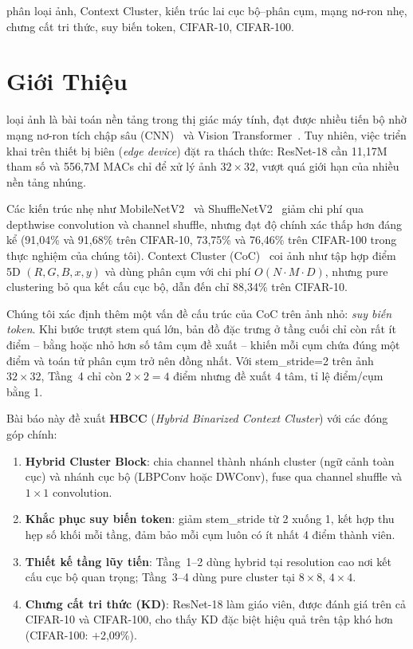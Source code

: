 \documentclass[journal]{IEEEtran}
\begin{document}
\begin{IEEEkeywords}
phân loại ảnh, Context Cluster, kiến trúc lai cục bộ--phân cụm,
mạng nơ-ron nhẹ, chưng cất tri thức, suy biến token, CIFAR-10,
CIFAR-100.
\end{IEEEkeywords}

\section{Giới Thiệu}
\label{sec:intro}

 loại ảnh là bài toán nền tảng trong thị giác máy
tính, đạt được nhiều tiến bộ nhờ mạng nơ-ron tích chập sâu
(CNN)~\cite{He2016ResNet} và Vision Transformer~\cite{Dosovitskiy2021ViT}.
Tuy nhiên, việc triển khai trên thiết bị biên (\textit{edge device})
đặt ra thách thức: ResNet-18 cần 11,17M tham số và 556,7M MACs chỉ để
xử lý ảnh $32\!\times\!32$, vượt quá giới hạn của nhiều nền tảng nhúng.

Các kiến trúc nhẹ như MobileNetV2~\cite{Sandler2018MobileNetV2} và
ShuffleNetV2~\cite{Ma2018ShuffleNetV2} giảm chi phí qua depthwise
convolution và channel shuffle, nhưng đạt độ chính xác thấp hơn đáng
kể (91,04\% và 91,68\% trên CIFAR-10, 73,75\% và 76,46\% trên
CIFAR-100 trong thực nghiệm của chúng tôi). Context Cluster
(CoC)~\cite{Ma2023ImageAsSetOfPoints} coi ảnh như tập hợp điểm 5D
$(R,G,B,x,y)$ và dùng phân cụm với chi phí $O(N\!\cdot\!M\!\cdot\!D)$,
nhưng pure clustering bỏ qua kết cấu cục bộ, dẫn đến chỉ 88,34\%
trên CIFAR-10.

Chúng tôi xác định thêm một vấn đề cấu trúc của CoC trên ảnh nhỏ:
\emph{suy biến token}. Khi bước trượt stem quá lớn, bản đồ đặc trưng
ở tầng cuối chỉ còn rất ít điểm -- bằng hoặc nhỏ hơn số tâm cụm đề
xuất -- khiến mỗi cụm chứa đúng một điểm và toán tử phân cụm trở
nên đồng nhất. Với stem\_stride=2 trên ảnh $32\!\times\!32$, Tầng~4
chỉ còn $2\!\times\!2=4$ điểm nhưng đề xuất 4 tâm, tỉ lệ điểm/cụm
bằng 1.

Bài báo này đề xuất \textbf{HBCC} (\textit{Hybrid Binarized Context
Cluster}) với các đóng góp chính:
\begin{enumerate}
  \item \textbf{Hybrid Cluster Block}: chia channel thành nhánh
        cluster (ngữ cảnh toàn cục) và nhánh cục bộ (LBPConv hoặc
        DWConv), fuse qua channel shuffle và $1\!\times\!1$ convolution.
  \item \textbf{Khắc phục suy biến token}: giảm stem\_stride từ 2
        xuống 1, kết hợp thu hẹp số khối mỗi tầng, đảm bảo mỗi cụm
        luôn có ít nhất 4 điểm thành viên.
  \item \textbf{Thiết kế tầng lũy tiến}: Tầng~1--2 dùng hybrid tại
        resolution cao nơi kết cấu cục bộ quan trọng; Tầng~3--4 dùng
        pure cluster tại $8\!\times\!8$, $4\!\times\!4$.
  \item \textbf{Chưng cất tri thức (KD)}: ResNet-18 làm giáo viên,
        được đánh giá trên cả CIFAR-10 và CIFAR-100, cho thấy KD
        đặc biệt hiệu quả trên tập khó hơn (CIFAR-100: $+$2,09\%).
\end{enumerate}
\end{document}
